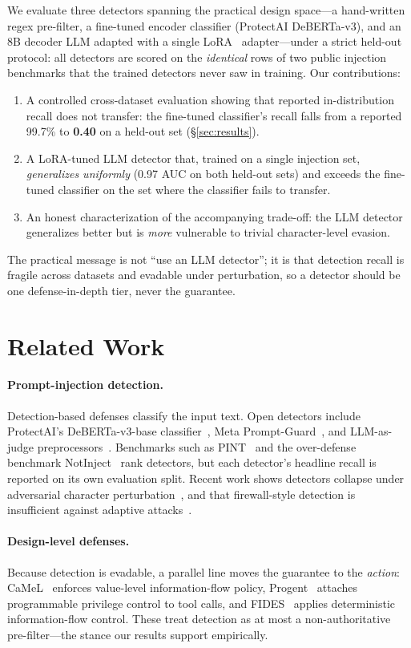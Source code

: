 \documentclass[11pt]{article}
\newcommand{\best}[1]{\textbf{#1}}
\begin{document}
We evaluate three detectors spanning the practical design space---a hand-written regex pre-filter, a
fine-tuned encoder classifier (ProtectAI DeBERTa-v3), and an 8B decoder LLM adapted with a single
LoRA~\citep{hu2022lora} adapter---under a strict held-out protocol: all detectors are scored on the
\emph{identical} rows of two public injection benchmarks that the trained detectors never saw in
training. Our contributions:
\begin{enumerate}\setlength\itemsep{2pt}
\item A controlled cross-dataset evaluation showing that reported in-distribution recall
does not transfer: the fine-tuned classifier's recall falls from a reported 99.7\% to
\best{0.40} on a held-out set (\S\ref{sec:results}).
\item A LoRA-tuned LLM detector that, trained on a single injection set, \emph{generalizes
uniformly} (0.97 AUC on both held-out sets) and exceeds the fine-tuned classifier on the set where
the classifier fails to transfer.
\item An honest characterization of the accompanying trade-off: the LLM detector generalizes
better but is \emph{more} vulnerable to trivial character-level evasion.
\end{enumerate}
The practical message is not ``use an LLM detector''; it is that detection recall is fragile
across datasets and evadable under perturbation, so a detector should be one defense-in-depth tier,
never the guarantee.

\section{Related Work}
\paragraph{Prompt-injection detection.}
Detection-based defenses classify the input text. Open detectors include ProtectAI's
DeBERTa-v3-base classifier~\citep{protectai}, Meta Prompt-Guard~\citep{promptguard}, and
LLM-as-judge preprocessors~\citep{promptarmor}. Benchmarks such as
PINT~\citep{pint} and the over-defense benchmark NotInject~\citep{injecguard} rank detectors, but
each detector's headline recall is reported on its own evaluation split. Recent work shows detectors
collapse under adversarial character perturbation~\citep{guardrails}, and that firewall-style
detection is insufficient against adaptive attacks~\citep{firewalls}.

\paragraph{Design-level defenses.}
Because detection is evadable, a parallel line moves the guarantee to the \emph{action}:
CaMeL~\citep{camel} enforces value-level information-flow policy, Progent~\citep{progent} attaches
programmable privilege control to tool calls, and FIDES~\citep{fides} applies deterministic
information-flow control. These treat detection as at most a non-authoritative pre-filter---the
stance our results support empirically.
\end{document}

